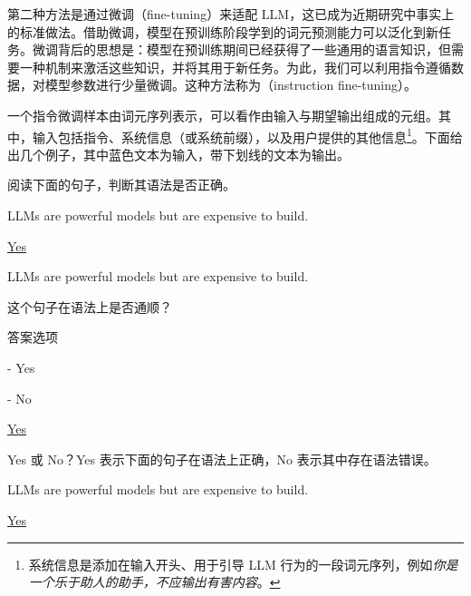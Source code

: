 第二种方法是通过微调（fine-tuning）来适配 LLM，这已成为近期研究中事实上的标准做法。借助微调，模型在预训练阶段学到的词元预测能力可以泛化到新任务。微调背后的思想是：模型在预训练期间已经获得了一些通用的语言知识，但需要一种机制来激活这些知识，并将其用于新任务。为此，我们可以利用指令遵循数据，对模型参数进行少量微调。这种方法称为（instruction fine-tuning）。

一个指令微调样本由词元序列表示，可以看作由输入与期望输出组成的元组。其中，输入包括指令、系统信息（或系统前缀），以及用户提供的其他信息\footnote{系统信息是添加在输入开头、用于引导 LLM 行为的一段词元序列，例如\textit{你是一个乐于助人的助手，不应输出有害内容}。}。下面给出几个例子，其中蓝色文本为输入，带下划线的文本为输出。

\vspace{0.5em}
\begin{tcolorbox}
\begin{center}
\parbox{0.9\textwidth}
{
{\color{blue} 阅读下面的句子，判断其语法是否正确。}

{\color{blue} LLMs are powerful models but are expensive to build.}

\vspace{0.3em}

\underline{Yes}
}
\end{center}
\end{tcolorbox}

\vspace{0.5em}
\begin{tcolorbox}
\begin{center}
\parbox{0.9\textwidth}
{
{\color{blue} LLMs are powerful models but are expensive to build.}

{\color{blue} 这个句子在语法上是否通顺？}

{\color{blue} 答案选项}

{\color{blue} - Yes}

{\color{blue} - No}

\vspace{0.3em}

\underline{Yes}
}
\end{center}
\end{tcolorbox}

\vspace{0.5em}
\begin{tcolorbox}
\begin{center}
\parbox{0.9\textwidth}
{
{\color{blue} Yes 或 No？Yes 表示下面的句子在语法上正确，No 表示其中存在语法错误。}

{\color{blue} LLMs are powerful models but are expensive to build.}

\vspace{0.3em}

\underline{Yes}
}
\end{center}
\end{tcolorbox}
\vspace{0.5em}

